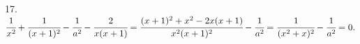 17. $\cfrac{1}{x^2}+\cfrac{1}{(x+1)^2}-\cfrac{1}{a^2}-\cfrac{2}{x(x+1)}=
\cfrac{(x+1)^2+x^2-2x(x+1)}{x^2(x+1)^2}-\cfrac{1}{a^2}=\cfrac{1}{(x^2+x)^2}-\cfrac{1}{a^2}=0.$\\
